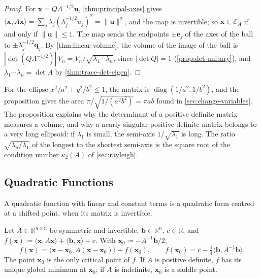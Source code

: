 \begin{proof}
For $\mathbf x=Q\Lambda^{-1/2}\mathbf u$, \cref{thm:principal-axes} gives $\langle\mathbf x,A\mathbf x\rangle=\sum_j\lambda_j(\lambda_j^{-1/2}u_j)^2=\|\mathbf u\|^2$, and the map is invertible; so $\mathbf x\in\mathcal E_A$ if and only if $\|\mathbf u\|\le1$. The map sends the endpoints $\pm\mathbf e_j$ of the axes of the ball to $\pm\lambda_j^{-1/2}\mathbf q_j$. By \cref{thm:linear-volume}, the volume of the image of the ball is $|\det(Q\Lambda^{-1/2})|\,V_n=V_n/\sqrt{\lambda_1\cdots\lambda_n}$, since $|\det Q|=1$ (\cref{prop:det-unitary}), and $\lambda_1\cdots\lambda_n=\det A$ by \cref{thm:trace-det-eigen}.
\end{proof}

For the ellipse $x^2/a^2+y^2/b^2\le1$, the matrix is $\operatorname{diag}(1/a^2,1/b^2)$, and the proposition gives the area $\pi/\sqrt{1/(a^2b^2)}=\pi ab$ found in \cref{sec:change-variables}. The proposition explains why the determinant of a positive definite matrix measures a volume, and why a nearly singular positive definite matrix belongs to a very long ellipsoid: if $\lambda_1$ is small, the semi-axis $1/\sqrt{\lambda_1}$ is long. The ratio $\sqrt{\lambda_n/\lambda_1}$ of the longest to the shortest semi-axis is the square root of the condition number $\kappa_2(A)$ of \cref{sec:rayleigh}.

\subsection{Quadratic Functions}

A quadratic function with linear and constant terms is a quadratic form centred at a shifted point, when its matrix is invertible.

\begin{proposition}
\label{prop:quadratic-centre}
Let $A\in\mathbb R^{n\times n}$ be symmetric and invertible, $\mathbf b\in\mathbb R^n$, $c\in\mathbb R$, and $f(\mathbf x)\coloneqq\langle\mathbf x,A\mathbf x\rangle+\langle\mathbf b,\mathbf x\rangle+c$. With $\mathbf x_0\coloneqq-A^{-1}\mathbf b/2$,
\[
f(\mathbf x)=\langle\mathbf x-\mathbf x_0,A(\mathbf x-\mathbf x_0)\rangle+f(\mathbf x_0),\qquad f(\mathbf x_0)=c-\tfrac14\langle\mathbf b,A^{-1}\mathbf b\rangle .
\]
The point $\mathbf x_0$ is the only critical point of $f$. If $A$ is positive definite, $f$ has its unique global minimum at $\mathbf x_0$; if $A$ is indefinite, $\mathbf x_0$ is a saddle point.
\end{proposition}

